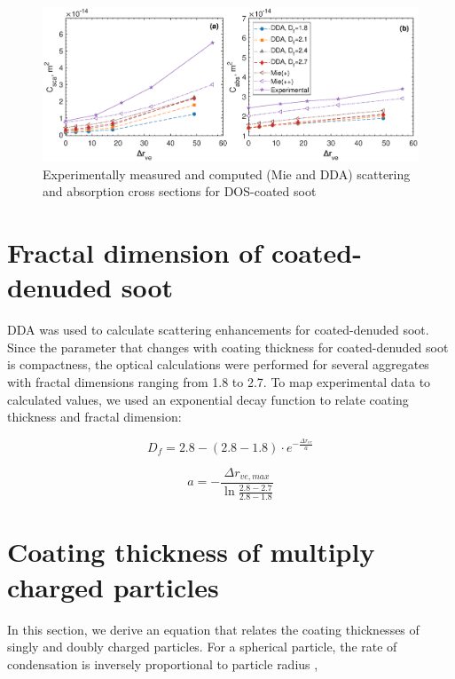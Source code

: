 \documentclass[12pt]{article}
\begin{document}
\begin{figure}[htp]
\centering
\includegraphics[width=\textwidth]{absolute-optics-modeling.eps}
\caption{Experimentally measured and computed (Mie and DDA) scattering and absorption cross sections for DOS-coated soot}
\label{s:fig:dda}
\end{figure}

\section{Fractal dimension of coated-denuded soot}
\label{s:sec:drve2df}

DDA was used to calculate scattering enhancements for coated-denuded soot. Since the parameter that changes with coating thickness for coated-denuded soot is compactness, the optical calculations were performed for several aggregates with fractal dimensions ranging from 1.8 to 2.7. To map experimental data to calculated values, we used an exponential decay function to relate coating thickness and fractal dimension:

\begin{equation}
    D_f=2.8-(2.8-1.8)\cdot e^{-\frac{\Delta r_{ve}}{a}}
\end{equation}

\begin{equation}
    a=-\frac{\Delta r_{ve,max}}{\ln{\frac{2.8-2.7}{2.8-1.8}}}
\end{equation}

\section{Coating thickness of multiply charged particles}
\label{s:sec:drve_multiply_charged}

In this section, we derive an equation that relates the coating thicknesses of singly and doubly charged particles. For a spherical particle, the rate of condensation is inversely proportional to particle radius \citep{RN2},
\end{document}

